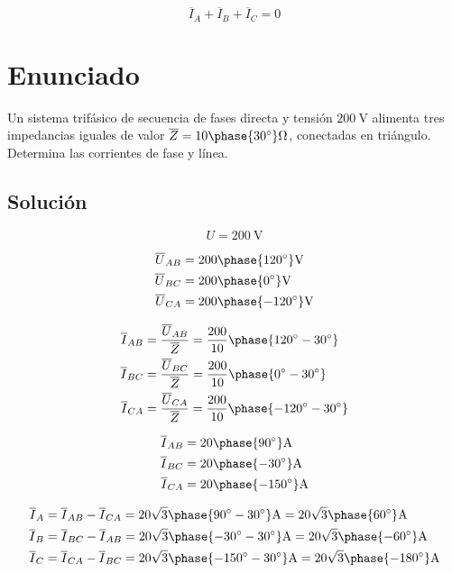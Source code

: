 \[ \overline{I}_A + \overline{I}_B + \overline{I}_C = 0
\]

\clearpage
 
\section{Enunciado}

Un sistema trifásico de secuencia de fases directa y tensión
$\SI{200}{\volt}$ alimenta tres impedancias iguales de valor
$\overline{Z} = {10\phase{\ang{30}}}\unit{\ohm}$,
conectadas en triángulo. Determina las corrientes de fase y línea.

\subsection*{Solución}

\[
  U = \SI[parse-numbers=false]{200}{\volt}
\]
  
  \begin{align*}
    \overline{U}_{AB} &= {200\phase{\ang{120}}}\unit{\volt}\\
    \overline{U}_{BC} &= {200\phase{\ang{0}}}\unit{\volt}\\
    \overline{U}_{CA} &= {200\phase{\ang{-120}}}\unit{\volt}\\
  \end{align*}

 \begin{align*}
   \overline{I}_{AB} &= \frac{\overline{U}_{AB}}{\overline{Z}} = \frac{200}{10}\phase{\ang{120} - \ang{30}} \\
   \overline{I}_{BC} &= \frac{\overline{U}_{BC}}{\overline{Z}} = \frac{200}{10}\phase{\ang{0} - \ang{30}}\\
   \overline{I}_{CA} &= \frac{\overline{U}_{CA}}{\overline{Z}} = \frac{200}{10}\phase{\ang{-120} - \ang{30}}
 \end{align*}

  \begin{align*}
    \overline{I}_{AB} &= {20\phase{\ang{90}}}\unit{\ampere}\\
    \overline{I}_{BC} &= {20\phase{\ang{-30}}}\unit{\ampere}\\
    \overline{I}_{CA} &= {20\phase{\ang{-150}}}\unit{\ampere}
  \end{align*}

 \begin{align*}
   \overline{I}_A &= \overline{I}_{AB} - \overline{I}_{CA} = {20\sqrt{3}\phase{\ang{90}-\ang{30}}}\unit{\ampere}=  {20\sqrt{3}\phase{\ang{60}}}\unit{\ampere}\\
   \overline{I}_B &= \overline{I}_{BC} - \overline{I}_{AB} = {20\sqrt{3}\phase{\ang{-30} - \ang{30}}}\unit{\ampere} =  {20\sqrt{3}\phase{\ang{-60}}}\unit{\ampere}\\
   \overline{I}_C &= \overline{I}_{CA} - \overline{I}_{BC} = {20\sqrt{3}\phase{\ang{-150} - \ang{30}}}\unit{\ampere}=  {20\sqrt{3}\phase{\ang{-180}}}\unit{\ampere}
 \end{align*}

